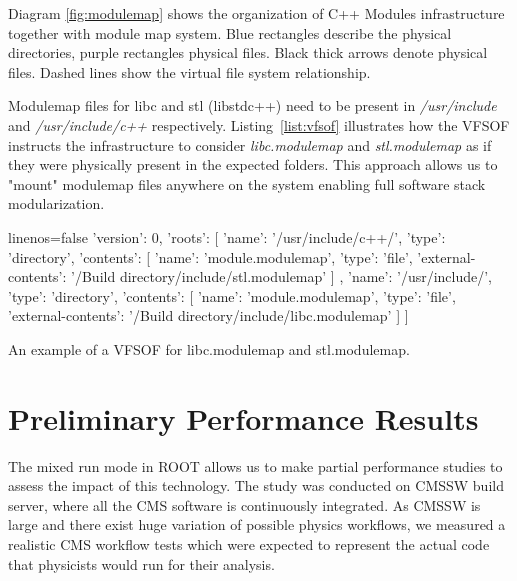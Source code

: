 \documentclass[12pt]{iopart}
\begin{document}
Diagram \ref{fig:modulemap} shows the organization of C++ Modules infrastructure together with module map system. Blue rectangles describe the physical directories, purple rectangles physical files. Black thick arrows denote physical files. Dashed lines show the virtual file system relationship.

Modulemap files for libc and stl (libstdc++) need to be present in \textit{/usr/include} and \textit{/usr/include/c++} respectively. Listing~\ref{list:vfsof} illustrates how the VFSOF instructs the infrastructure to consider \textit{libc.modulemap} and \textit{stl.modulemap} as if they were physically present in the expected folders. This approach allows us to "mount" modulemap files anywhere on the system enabling full software stack modularization.

\begin{listing}[h]
\noindent
\begin{minipage}[h]{\textwidth}
\begin{cppcode*}{linenos=false}
{
  'version': 0,
  'roots': [
    { 'name': '/usr/include/c++/', 'type': 'directory',
      'contents': [
        { 'name': 'module.modulemap', 'type': 'file',
          'external-contents': '/Build directory/include/stl.modulemap'
        }
      ]
    },
    { 'name': '/usr/include/', 'type': 'directory',
      'contents': [
        { 'name': 'module.modulemap', 'type': 'file',
          'external-contents': '/Build directory/include/libc.modulemap'
        }
      ]
    }
  ]
}
\end{cppcode*}
\end{minipage}
\caption{An example of a VFSOF for libc.modulemap and stl.modulemap.}
\label{list:vfsof}
\end{listing}




\section{Preliminary Performance Results}
\label{results}

The mixed run mode in ROOT allows us to make partial performance studies to assess the impact of this technology. The study was conducted on CMSSW build server, where all the CMS software is continuously integrated. As CMSSW is large and there exist huge variation of possible physics workflows, we measured a realistic CMS workflow tests which were expected to represent the actual code that physicists would run for their analysis.
\end{document}
